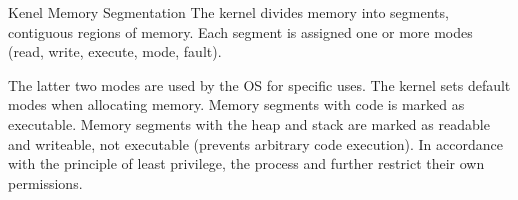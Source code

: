 \documentclass[12pt]{report}
\begin{document}
\begin{dfnbox}{Kenel Memory Segmentation}{}
    The kernel divides memory into segments, contiguous regions of memory. Each segment is assigned one or more modes (read, write, execute, mode, fault).
\end{dfnbox}

The latter two modes are used by the OS for specific uses. The kernel sets default modes when allocating memory. Memory segments with code is marked as executable. Memory segments with the heap and stack are marked as readable and writeable, not executable (prevents arbitrary code execution). In accordance with the principle of least privilege, the process and further restrict their own permissions.

\amzindex
\end{document}
